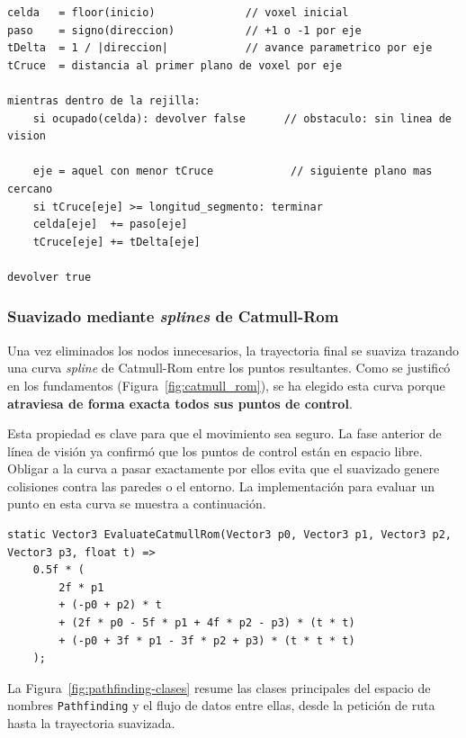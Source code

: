 \begin{lstlisting}
celda   = floor(inicio)              // voxel inicial
paso    = signo(direccion)           // +1 o -1 por eje
tDelta  = 1 / |direccion|            // avance parametrico por eje
tCruce  = distancia al primer plano de voxel por eje

mientras dentro de la rejilla:
    si ocupado(celda): devolver false      // obstaculo: sin linea de vision

    eje = aquel con menor tCruce            // siguiente plano mas cercano
    si tCruce[eje] >= longitud_segmento: terminar
    celda[eje]  += paso[eje]
    tCruce[eje] += tDelta[eje]

devolver true
\end{lstlisting}

\subsubsection{Suavizado mediante \textit{splines} de Catmull-Rom}

Una vez eliminados los nodos innecesarios, la trayectoria final se suaviza trazando una curva \textit{spline} de Catmull-Rom entre los puntos resultantes.
Como se justificó en los fundamentos (Figura~\ref{fig:catmull_rom}), se ha elegido esta curva porque \textbf{atraviesa de forma exacta todos sus puntos de control}.

Esta propiedad es clave para que el movimiento sea seguro.
La fase anterior de línea de visión ya confirmó que los puntos de control están en espacio libre.
Obligar a la curva a pasar exactamente por ellos evita que el suavizado genere colisiones contra las paredes o el entorno.
La implementación para evaluar un punto en esta curva se muestra a continuación.

\begin{lstlisting}[language={[Sharp]C}]
static Vector3 EvaluateCatmullRom(Vector3 p0, Vector3 p1, Vector3 p2, Vector3 p3, float t) =>
    0.5f * (
        2f * p1
        + (-p0 + p2) * t
        + (2f * p0 - 5f * p1 + 4f * p2 - p3) * (t * t)
        + (-p0 + 3f * p1 - 3f * p2 + p3) * (t * t * t)
    );
\end{lstlisting}

La Figura~\ref{fig:pathfinding-clases} resume las clases principales del espacio de nombres \texttt{Pathfinding} y el flujo de datos entre ellas, desde la petición de ruta hasta la trayectoria suavizada.

